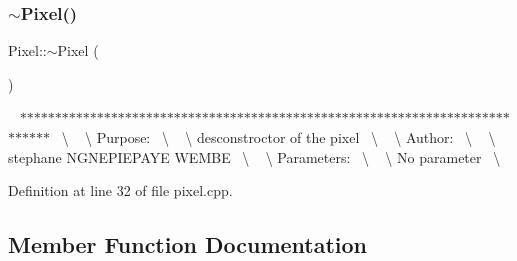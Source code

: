 \mbox{\label{class_pixel_a30f6aaf9a1d8792245070860546fa365}} 
\subsubsection{\texorpdfstring{$\sim$\+Pixel()}{~Pixel()}}
{\footnotesize\ttfamily Pixel\+::$\sim$\+Pixel (\begin{DoxyParamCaption}{ }\end{DoxyParamCaption})}

~\newline
$\ast$$\ast$$\ast$$\ast$$\ast$$\ast$$\ast$$\ast$$\ast$$\ast$$\ast$$\ast$$\ast$$\ast$$\ast$$\ast$$\ast$$\ast$$\ast$$\ast$$\ast$$\ast$$\ast$$\ast$$\ast$$\ast$$\ast$$\ast$$\ast$$\ast$$\ast$$\ast$$\ast$$\ast$$\ast$$\ast$$\ast$$\ast$$\ast$$\ast$$\ast$$\ast$$\ast$$\ast$$\ast$$\ast$$\ast$$\ast$$\ast$$\ast$$\ast$$\ast$$\ast$$\ast$$\ast$$\ast$$\ast$$\ast$$\ast$$\ast$$\ast$$\ast$$\ast$$\ast$$\ast$$\ast$$\ast$$\ast$$\ast$$\ast$$\ast$$\ast$$\ast$$\ast$$\ast$$\ast$~\newline
\textbackslash{} ~\newline
\textbackslash{} Purpose\+:~\newline
\textbackslash{} ~\newline
\textbackslash{} desconstroctor of the pixel~\newline
\textbackslash{} ~\newline
\textbackslash{} Author\+:~\newline
\textbackslash{} ~\newline
\textbackslash{} stephane N\+G\+N\+E\+P\+I\+E\+P\+A\+YE W\+E\+M\+BE~\newline
\textbackslash{} ~\newline
\textbackslash{} Parameters\+:~\newline
\textbackslash{} ~\newline
\textbackslash{} No parameter~\newline
\textbackslash{} ~\newline


Definition at line 32 of file pixel.\+cpp.



\subsection{Member Function Documentation}
\mbox{\label{class_pixel_a22150f6c19217b513d58ef7ec7bda6a9}} 

